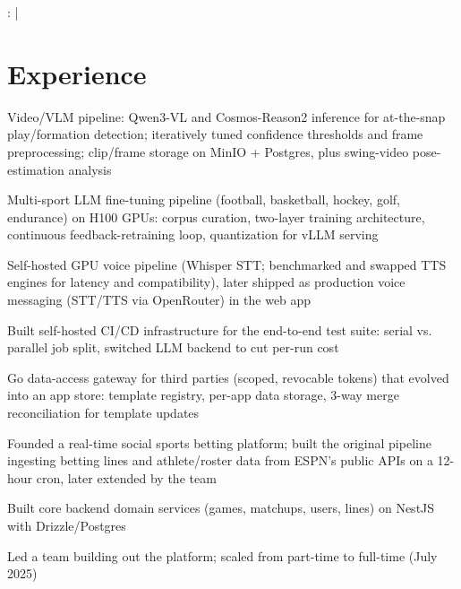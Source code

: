 \documentclass[print]{jack-resume}
\begin{document}
\raggedright{
    :
      \href{https://www.linkedin.com/in/jack-sturtevant/}{ \ExternalLink} |
     \href{https://github.com/jacksturt}{ \ExternalLink}}


\section{Experience}

\begin{tightemize}
    \item Video/VLM pipeline: Qwen3-VL and Cosmos-Reason2 inference for at-the-snap play/formation detection; iteratively tuned confidence thresholds and frame preprocessing; clip/frame storage on MinIO + Postgres, plus swing-video pose-estimation analysis
    \item Multi-sport LLM fine-tuning pipeline (football, basketball, hockey, golf, endurance) on H100 GPUs: corpus curation, two-layer training architecture, continuous feedback-retraining loop, quantization for vLLM serving
    \item Self-hosted GPU voice pipeline (Whisper STT; benchmarked and swapped TTS engines for latency and compatibility), later shipped as production voice messaging (STT/TTS via OpenRouter) in the web app
    \item Built self-hosted CI/CD infrastructure for the end-to-end test suite: serial vs. parallel job split, switched LLM backend to cut per-run cost
    \item Go data-access gateway for third parties (scoped, revocable tokens) that evolved into an app store: template registry, per-app data storage, 3-way merge reconciliation for template updates
\end{tightemize}
\sectionsep

\begin{tightemize}
    \item Founded a real-time social sports betting platform; built the original pipeline ingesting betting lines and athlete/roster data from ESPN's public APIs on a 12-hour cron, later extended by the team
    \item Built core backend domain services (games, matchups, users, lines) on NestJS with Drizzle/Postgres
    \item Led a team building out the platform; scaled from part-time to full-time (July 2025)
\end{tightemize}
\sectionsep
\end{document}
